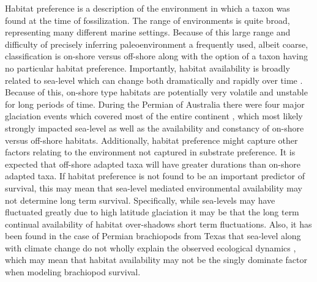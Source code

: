 \documentclass[12pt,letterpaper]{article}
\begin{document}
Habitat preference is a description of the environment in which a taxon was found at the time of fossilization. The range of environments is quite broad, representing many different marine settings. Because of this large range and difficulty of precisely inferring paleoenvironment a frequently used, albeit coarse, classification is on-shore versus off-shore \citep{Sepkoski1991,Kiessling2007a,Bottjer1988,Jablonski1991,Jablonski1983b} along with the option of a taxon having no particular habitat preference. Importantly, habitat availability is broadly related to sea-level which can change both dramatically and rapidly over time \citep{Olszewski2004}. Because of this, on-shore type habitats are potentially very volatile and unstable for long periods of time. During the Permian of Australia there were four major glaciation events which covered most of the entire continent \citep{Fielding2008,Birgenheier2010,Fielding2008a,Fielding2006}, which most likely strongly impacted sea-level as well as the availability and constancy of on-shore versus off-shore habitats. Additionally, habitat preference might capture other factors relating to the environment not captured in substrate preference. It is expected that off-shore adapted taxa will have greater durations than on-shore adapted taxa. If habitat preference is not found to be an important predictor of survival, this may mean that sea-level mediated environmental availability may not determine long term survival. Specifically, while sea-levels may have fluctuated greatly due to high latitude glaciation \citep{Fielding2008,Fielding2008a,Birgenheier2010} it may be that the long term continual availability of habitat over-shadows short term fluctuations. Also, it has been found in the case of Permian brachiopods from Texas that sea-level along with climate change do not wholly explain the observed ecological dynamics \citep{Olszewski2004}, which may mean that habitat availability may not be the singly dominate factor when modeling brachiopod survival. 
\end{document}
